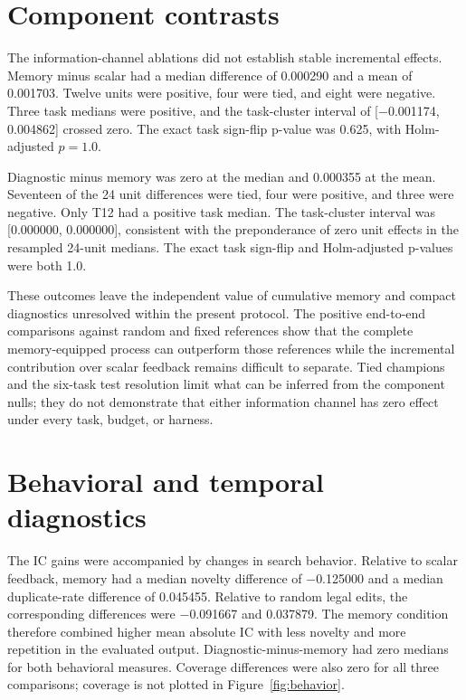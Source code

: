 \section{Component contrasts}
\label{sec:components}

The information-channel ablations did not establish stable incremental effects. Memory minus scalar had a median difference of 0.000290 and a mean of 0.001703. Twelve units were positive, four were tied, and eight were negative. Three task medians were positive, and the task-cluster interval of [$-$0.001174, 0.004862] crossed zero. The exact task sign-flip p-value was 0.625, with Holm-adjusted $p=1.0$.

Diagnostic minus memory was zero at the median and 0.000355 at the mean. Seventeen of the 24 unit differences were tied, four were positive, and three were negative. Only T12 had a positive task median. The task-cluster interval was [0.000000, 0.000000], consistent with the preponderance of zero unit effects in the resampled 24-unit medians. The exact task sign-flip and Holm-adjusted p-values were both 1.0.

These outcomes leave the independent value of cumulative memory and compact diagnostics unresolved within the present protocol. The positive end-to-end comparisons against random and fixed references show that the complete memory-equipped process can outperform those references while the incremental contribution over scalar feedback remains difficult to separate. Tied champions and the six-task test resolution limit what can be inferred from the component nulls; they do not demonstrate that either information channel has zero effect under every task, budget, or harness.

\section{Behavioral and temporal diagnostics}
\label{sec:behavior}

The IC gains were accompanied by changes in search behavior. Relative to scalar feedback, memory had a median novelty difference of $-$0.125000 and a median duplicate-rate difference of 0.045455. Relative to random legal edits, the corresponding differences were $-$0.091667 and 0.037879. The memory condition therefore combined higher mean absolute IC with less novelty and more repetition in the evaluated output. Diagnostic-minus-memory had zero medians for both behavioral measures. Coverage differences were also zero for all three comparisons; coverage is not plotted in Figure~\ref{fig:behavior}.

